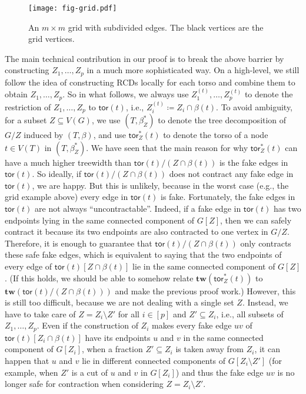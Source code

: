 \documentclass[a4paper,11pt]{article}
\numberwithin{lemma}{section}
\newcommand{\tw}{\mathbf{tw}}
\newcommand{\tor}{\mathsf{tor}}
\begin{document}
\begin{figure}
 \centering
 \texttt{[image: fig-grid.pdf]}
 \caption{An $m \times m$ grid with subdivided edges. The black vertices are the grid vertices.}
 \label{fig-grid}
\end{figure}

The main technical contribution in our proof is to break the above barrier by constructing $Z_1,\dots,Z_p$ in a much more sophisticated way.
On a high-level, we still follow the idea of constructing RCDs locally for each torso and combine them to obtain $Z_1,\dots,Z_p$.
So in what follows, we always use $Z_1^{(t)},\dots,Z_p^{(t)}$ to denote the restriction of $Z_1,\dots,Z_p$ to $\tor(t)$, i.e., $Z_i^{(t)} \coloneqq Z_i \cap \beta(t)$.
To avoid ambiguity, for a subset $Z \subseteq V(G)$, we use $(T,\beta_Z^*)$ to denote the tree decomposition of $G/Z$ induced by $(T,\beta)$, and use $\tor_Z^*(t)$ to denote the torso of a node $t \in V(T)$ in $(T,\beta_Z^*)$.
We have seen that the main reason for why $\tor_Z^*(t)$ can have a much higher treewidth than $\tor(t)/(Z \cap \beta(t))$ is the fake edges in $\tor(t)$.
So ideally, if $\tor(t)/(Z \cap \beta(t))$ does not contract any fake edge in $\tor(t)$, we are happy.
But this is unlikely, because in the worst case (e.g., the grid example above) every edge in $\tor(t)$ is fake.
Fortunately, the fake edges in $\tor(t)$ are not always ``uncontractable''.
Indeed, if a fake edge in $\tor(t)$ has two endpoints lying in the same connected component of $G[Z]$, then we can safely contract it because its two endpoints are also contracted to one vertex in $G/Z$.
Therefore, it is enough to guarantee that $\tor(t)/(Z \cap \beta(t))$ only contracts these safe fake edges, which is equivalent to saying that the two endpoints of every edge of $\tor(t)[Z \cap \beta(t)]$ lie in the same connected component of $G[Z]$.
(If this holds, we should be able to somehow relate $\tw(\tor_Z^*(t))$ to $\tw(\tor(t)/(Z \cap \beta(t)))$ and make the previous proof work.)
However, this is still too difficult, because we are not dealing with a single set $Z$.
Instead, we have to take care of $Z = Z_i \setminus Z'$ for all $i \in [p]$ and $Z' \subseteq Z_i$, i.e., all subsets of $Z_1,\dots,Z_p$.
Even if the construction of $Z_i$ makes every fake edge $uv$ of $\tor(t)[Z_i \cap \beta(t)]$ have its endpoints $u$ and $v$ in the same connected component of $G[Z_i]$, when a fraction $Z' \subseteq Z_i$ is taken away from $Z_i$, it can happen that $u$ and $v$ lie in different connected components of $G[Z_i \setminus Z']$ (for example, when $Z'$ is a cut of $u$ and $v$ in $G[Z_i]$) and thus the fake edge $uv$ is no longer safe for contraction when considering $Z = Z_i \setminus Z'$.
\end{document}
